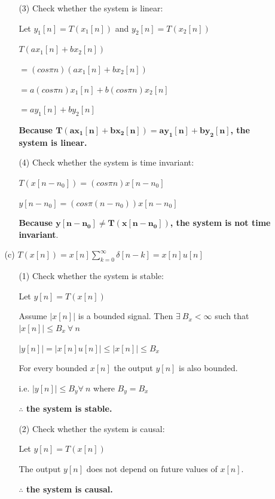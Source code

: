 \documentclass[fleqn]{article}
\begin{document}
\begin{enumerate}[nolistsep]
\begin{enumerate}[nolistsep]
\begin{enumerate}[nolistsep]
					\item[(3)] Check whether the system is linear:
					
					Let $y_1[n] = T(x_1[n])$ and $y_2[n] = T(x_2[n])$
					
					$T(ax_1[n] + bx_2[n])$
					
					$ = (cos{\pi}n)(ax_1[n] + bx_2[n])$
					
					$ = a(cos{\pi}n)x_1[n] + b(cos{\pi}n)x_2[n]$
					
					$ = ay_1[n] + by_2[n]$
					
					\textbf{Because $\mathbf{T(ax_1[n] + bx_2[n]) = ay_1[n] + by_2[n]}$, the system is linear.}
					
					\item[(4)] Check whether the system is time invariant:
					
					$T(x[n-n_0]) = (cos{\pi}n)x[n-n_0]$
					
					$y[n-n_0] = (cos{\pi}(n-n_0))x[n-n_0]$
					
					\textbf{Because $\mathbf{y[n-n_0] \neq T(x[n-n_0])}$, the system is not time invariant}.
				\end{enumerate}
					
				\item[(c)] $T(x[n]) = x[n]\sum_{k=0}^{\infty}{\delta[n-k]} = x[n]u[n]$
					
				\begin{enumerate}[nolistsep]
					\item[(1)] Check whether the system is stable:
			
					Let $y[n] = T(x[n])$
			
					Assume $|x[n]|$ is a bounded signal. Then $\exists\ B_x < \infty$ such that  $|x[n]| \leq B_x\ \forall\ n$
			
					$|y[n]| = |x[n]u[n]| \leq |x[n]| \leq B_x$
			
					For every bounded $x[n]$ the output $y[n]$ is also bounded.
			
					i.e. $|y[n]| \leq B_y \forall\ n$ where $B_y = B_x$
					
					\textbf{$\mathbf{\therefore}$ the system is stable.}
					
					\item[(2)] Check whether the system is causal:
					
					Let $y[n] = T(x[n])$
					
					The output $y[n]$ does not depend on future values of $x[n]$.
					
					\textbf{$\mathbf{\therefore}$ the system is causal.}
					

\end{enumerate}
\end{enumerate}
\end{enumerate}
\end{document}

